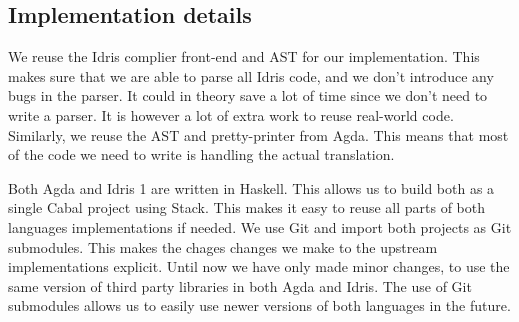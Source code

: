\documentclass[parskip=half]{scrartcl}
\begin{document}





\subsection{Implementation details}

We reuse the Idris complier front-end and AST for our implementation. This
makes sure that we are able to parse all Idris code, and we don't introduce any
bugs in the parser. It could in theory save a lot of time since we don't need
to write a parser. It is however a lot of extra work to reuse real-world code.
Similarly, we reuse the AST and pretty-printer from Agda. This means that most
of the code we need to write is handling the actual translation.

Both Agda and Idris 1 are written in Haskell.  This allows us to build both as
a single Cabal project using Stack.  This makes it easy to reuse all parts of
both languages implementations if needed.  We use Git and import both projects
as Git submodules. This makes the chages changes we make to the upstream
implementations explicit.  Until now we have only made minor changes, to use
the same version of third party libraries in both Agda and Idris. The use of
Git submodules allows us to easily use newer versions of both languages in the
future.


\end{document}
